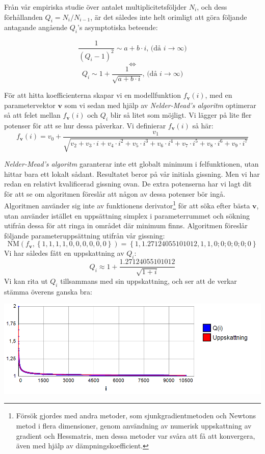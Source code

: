 Från vår empiriska studie över antalet multiplicitetsföljder $N_i$, och dess förhållanden $Q_i=N_i/N_{i-1}$, är det således inte helt orimligt att göra följande antagande angående $Q_i$'s asymptotiska beteende:

\[\frac{1}{\left(Q_i-1\right)^2} \sim a+b\cdot i \text{, (då $i \rightarrow \infty$)}\]
\[\Longleftrightarrow \]
\[Q_i \sim 1+\frac{1}{\sqrt{a+b\cdot i}}\text{, (då $i \rightarrow \infty$)} \]

För att hitta koefficienterna skapar vi en modellfunktion $f_\mathbf{v}(i)$, med en parametervektor $\mathbf{v}$ som vi sedan med hjälp av \emph{Nelder-Mead's algoritm} \cite{NelderMead} optimerar så att felet mellan $f_\mathbf{v}(i)$ och $Q_i$ blir så litet som möjligt. Vi lägger på lite fler potenser för att se hur dessa påverkar. Vi definierar $f_\mathbf{v}(i)$ så här:
\[f_\mathbf{v}(i)=v_0+\frac{v_1}{\sqrt{v_2+v_3\cdot i+v_4\cdot i^2+v_5\cdot i^3+v_6\cdot i^4+v_7\cdot i^5+v_8\cdot i^6+v_9\cdot i^7}}\]

\emph{Nelder-Mead's algoritm} garanterar inte ett globalt minimum i felfunktionen, utan hittar bara ett lokalt sådant. Resultatet beror på vår initiala gissning. Men vi har redan en relativt kvalificerad gissning ovan. De extra potenserna har vi lagt dit för att se om algoritmen föreslår att någon av dessa potenser bör ingå. Algoritmen använder sig inte av funktionens derivator\footnote{Försök gjordes med andra metoder, som sjunkgradientmetoden och Newtons metod i flera dimensioner, genom användning av numerisk uppskattning av gradient och Hessmatris, men dessa metoder var svåra att få att konvergera, även med hjälp av dämpningskoefficient.} för att söka efter bästa $\mathbf{v}$, utan använder istället en uppsättning simplex i parameterrummet och sökning utifrån dessa för att ringa in området där minimum finns. Algoritmen föreslår följande parameteruppsättning utifrån vår gissning:
\[\text{NM}(f_\mathbf{v},\left\{1,1,1,1,0,0,0,0,0,0\right\})= \left\{1, 1.27124055101012, 1, 1, 0; 0; 0; 0; 0; 0\right\}\]
Vi har således fått en uppskattning av $Q_i$:
\[Q_i \approx 1+\frac{1.27124055101012}{\sqrt{1+i}} \]
Vi kan rita ut $Q_i$ tillsammans med sin uppskattning, och ser att de verkar stämma överens ganska bra:

\begin{center}
\includegraphics[scale=0.5]{Export/Complexity17.png}
\end{center}

